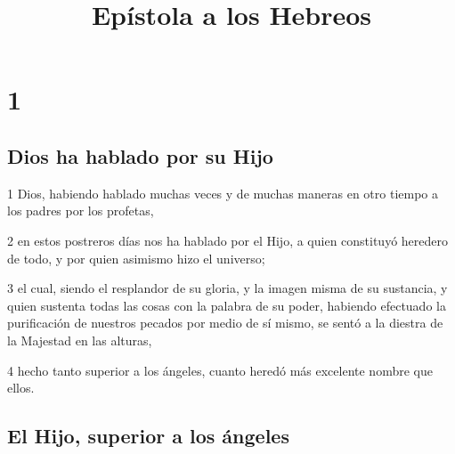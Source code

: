 
\title{Epístola a los Hebreos}

\chapter{1}

\section*{Dios ha hablado por su Hijo}

\par 1 Dios, habiendo hablado muchas veces y de muchas maneras en otro tiempo a los padres por los profetas,
\par 2 en estos postreros días nos ha hablado por el Hijo, a quien constituyó heredero de todo, y por quien asimismo hizo el universo;
\par 3 el cual, siendo el resplandor de su gloria, y la imagen misma de su sustancia, y quien sustenta todas las cosas con la palabra de su poder, habiendo efectuado la purificación de nuestros pecados por medio de sí mismo, se sentó a la diestra de la Majestad en las alturas,
\par 4 hecho tanto superior a los ángeles, cuanto heredó más excelente nombre que ellos.

\section*{El Hijo, superior a los ángeles}


